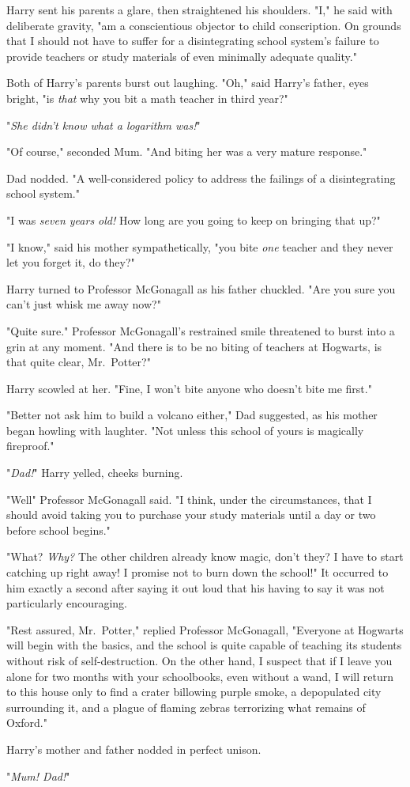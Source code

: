 Harry sent his parents a glare, then straightened his
shoulders. "I," he said with deliberate gravity, "am a
conscientious objector to child conscription. On grounds that
I should not have to suffer for a disintegrating school
system's failure to provide teachers or study materials of
even minimally adequate quality."

Both of Harry's parents burst out laughing.
"Oh," said Harry's father, eyes bright, "is \emph{that} why you
bit a math teacher in third year?"

"\emph{She didn't know what a logarithm was!}"

"Of course," seconded Mum. "And biting her was a very mature response."

Dad nodded. "A well-considered policy to address the
failings of a disintegrating school system."

"I was \emph{seven years old!} How long are you going to keep on bringing that
up?"

"I know," said his mother sympathetically, "you bite \emph{one} teacher
and they never let you forget it, do they?"

Harry turned to Professor McGonagall as his father
chuckled. "Are you sure you can't just whisk me away now?"

"Quite sure." Professor McGonagall's restrained smile
threatened to burst into a grin at any moment. "And there
is to be no biting of teachers at Hogwarts, is that quite
clear, Mr.~Potter?"

Harry scowled at her. "Fine, I won't bite anyone who
doesn't bite me first."

"Better not ask him to build a volcano either," Dad
suggested, as his mother began howling with laughter.
"Not unless this school of yours is magically fireproof."

"\emph{Dad!}" Harry yelled, cheeks burning.

"Well{\el}" Professor McGonagall said. "I think, under the
circumstances, that I should avoid taking you to purchase
your study materials until a day or two before school begins."

"What? \emph{Why?} The other children already know magic, don't
they? I have to start catching up right away! I promise
not to burn down the school!" It occurred to him exactly a
second after saying it out loud that his having to say it
was not particularly encouraging.

"Rest assured, Mr.~Potter," replied Professor McGonagall,
"Everyone at Hogwarts will begin with the basics, and the
school is quite capable of teaching its students without risk
of self-destruction. On the other hand, I suspect that if I
leave you alone for two months with your schoolbooks,
even without a wand, I will return to this house only to
find a crater billowing purple smoke, a depopulated city
surrounding it, and a plague of flaming zebras terrorizing
what remains of Oxford."

Harry's mother and father nodded in perfect unison.

"\emph{Mum! Dad!}"
